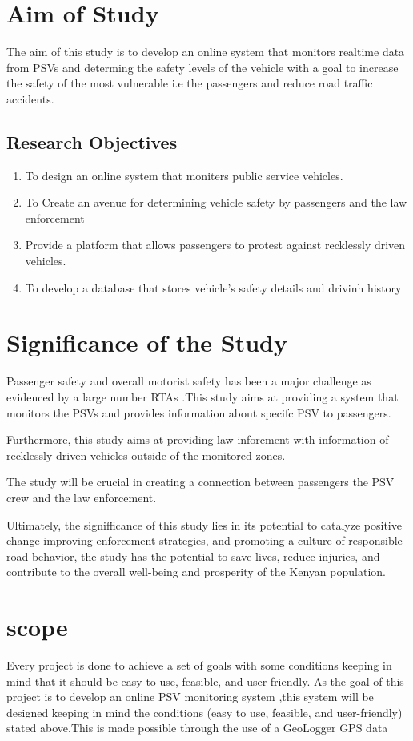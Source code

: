 \documentclass[a4paper, 12pt]{report}
\begin{document}
\section{Aim of Study}
\noindent The aim of this study is to develop an online system that monitors realtime data
from PSVs and determing the safety levels of the vehicle with a goal to increase the
safety of the most vulnerable i.e the passengers and reduce road traffic accidents.

\subsection{Research Objectives}
\noindent
\begin{enumerate}
\item To design an online system that moniters public service vehicles.
\item To Create an avenue for determining vehicle safety by passengers and the
law enforcement
\item Provide a platform that allows passengers to protest against recklessly driven
vehicles.
\item To develop a database that stores vehicle's safety details and drivinh history
\end{enumerate}

\section{Significance of the Study}
\noindent Passenger safety and overall motorist safety has been a major challenge as evidenced by a large number RTAs .This study aims at providing a system that
monitors the PSVs and provides information about specifc PSV to passengers.\par
Furthermore, this study aims at providing law inforcment with information of
recklessly driven vehicles outside of the monitored zones.\par
The study will be crucial in creating a connection between passengers the PSV
crew and the law enforcement.\par
Ultimately, the signifficance of this study lies in its potential to catalyze positive
change improving enforcement strategies, and promoting a culture of responsible road behavior, the study has the potential to save lives, reduce injuries, and
contribute to the overall well-being and prosperity of the Kenyan population.

\section{scope}
Every project is done to achieve a set of goals with some conditions keeping in
mind that it should be easy to use, feasible, and user-friendly. As the goal of
this project is to develop an online PSV monitoring system ,this system will be
designed keeping in mind the conditions (easy to use, feasible, and user-friendly)
stated above.This is made possible through the use of a GeoLogger GPS data
\end{document}
